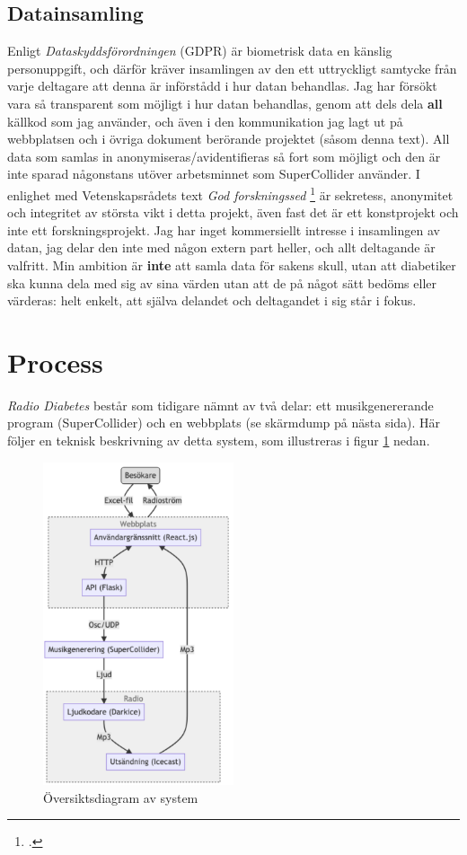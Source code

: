 \documentclass[11pt, a4paper]{article} %
\begin{document}
\subsection*{Datainsamling}
Enligt \emph{Dataskyddsförordningen} (GDPR) är biometrisk data en känslig personuppgift, och därför kräver insamlingen av den ett uttryckligt samtycke från varje deltagare att denna är införstådd i hur datan behandlas. Jag har försökt vara så transparent som möjligt i hur datan behandlas, genom att dels dela \textbf{all} källkod som jag använder, och även i den kommunikation jag lagt ut på webbplatsen och i övriga dokument berörande projektet (såsom denna text). All data som samlas in anonymiseras/avidentifieras så fort som möjligt och den är inte sparad någonstans utöver arbetsminnet som SuperCollider använder. I enlighet med Vetenskapsrådets text \emph{God forskningssed} \footcite[s. 40-41]{vetenskapsradet_god_2017} är sekretess, anonymitet och integritet av största vikt i detta projekt, även fast det är ett konstprojekt och inte ett forskningsprojekt. Jag har inget kommersiellt intresse i insamlingen av datan, jag delar den inte med någon extern part heller, och allt deltagande är valfritt. Min ambition är \textbf{inte} att samla data för sakens skull, utan att diabetiker ska kunna dela med sig av sina värden utan att de på något sätt bedöms eller värderas: helt enkelt, att själva delandet och deltagandet i sig står i fokus. 

\section*{Process}
\emph{Radio Diabetes} består som tidigare nämnt av två delar: ett musikgenererande program (SuperCollider) och en webbplats (se skärmdump på nästa sida). Här följer en teknisk beskrivning av detta system, som illustreras i figur \ref{system} nedan.

\begin{figure}[H]
\centering
\includegraphics[width=0.5\textwidth]{../media/flowchart.png}
\caption{Översiktsdiagram av system}
\label{system}
\end{figure}
\end{document}
